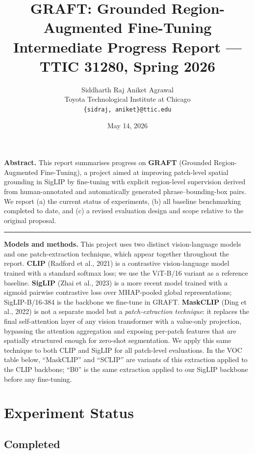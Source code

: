 \documentclass[10pt,onecolumn]{article}
\title{
    \Large\textbf{GRAFT: Grounded Region-Augmented Fine-Tuning}\\[4pt]
    \large Intermediate Progress Report --- TTIC 31280, Spring 2026
}
\author{
    Siddharth Raj \quad Aniket Agrawal \\
    Toyota Technological Institute at Chicago \\
    \texttt{\{sidraj, aniket\}@ttic.edu}
}
\date{May 14, 2026}
\begin{document}
\maketitle
\thispagestyle{empty}

\textbf{Abstract.}
This report summarises progress on \textbf{GRAFT} (Grounded Region-Augmented
Fine-Tuning), a project aimed at improving patch-level spatial grounding in
SigLIP by fine-tuning with explicit region-level supervision derived from
human-annotated and automatically generated phrase--bounding-box pairs.
We report (a) the current status of experiments, (b) all baseline benchmarking
completed to date, and (c) a revised evaluation design and scope relative to the
original proposal.

\hrule
\vspace{6pt}

\textbf{Models and methods.}
This project uses two distinct vision-language models and one patch-extraction
technique, which appear together throughout the report.
\textbf{CLIP} (Radford et al., 2021) is a contrastive vision-language model
trained with a standard softmax loss; we use the ViT-B/16 variant as a reference
baseline.
\textbf{SigLIP} (Zhai et al., 2023) is a more recent model trained with a sigmoid
pairwise contrastive loss over MHAP-pooled global representations; SigLIP-B/16-384
is the backbone we fine-tune in GRAFT.
\textbf{MaskCLIP} (Ding et al., 2022) is not a separate model but a
\textit{patch-extraction technique}: it replaces the final self-attention layer
of any vision transformer with a value-only projection, bypassing the attention
aggregation and exposing per-patch features that are spatially structured enough
for zero-shot segmentation. We apply this same technique to both CLIP and SigLIP
for all patch-level evaluations. In the VOC table below, ``MaskCLIP'' and
``SCLIP'' are variants of this extraction applied to the CLIP backbone; ``B0'' is
the same extraction applied to our SigLIP backbone before any fine-tuning.

\section{Experiment Status}

\subsection{Completed}
\end{document}
